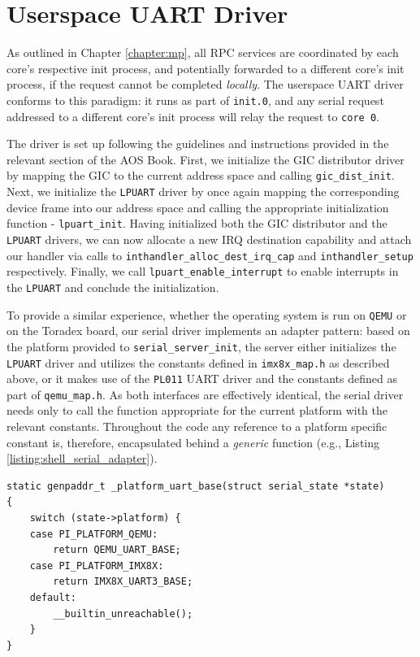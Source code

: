 \section{Userspace UART Driver}

As outlined in Chapter \ref{chapter:mp}, all RPC services are coordinated by each core's respective init process, and potentially forwarded to a different core's init process, if the request cannot be completed \emph{locally}. The userspace UART driver conforms to this paradigm: it runs as part of \texttt{init.0}, and any serial request addressed to a different core's init process will relay the request to \texttt{core 0}.

The driver is set up following the guidelines and instructions provided in the relevant section of the AOS Book. First, we initialize the GIC distributor driver by mapping the GIC to the current address space and calling \texttt{gic\_dist\_init}. Next, we initialize the \texttt{LPUART} driver by once again mapping the corresponding device frame into our address space and calling the appropriate initialization function - \texttt{lpuart\_init}. Having initialized both the GIC distributor and the \texttt{LPUART} drivers, we can now allocate a new IRQ destination capability and attach our handler via calls to \texttt{inthandler\_alloc\_dest\_irq\_cap} and \texttt{inthandler\_setup} respectively. Finally, we call \texttt{lpuart\_enable\_interrupt} to enable interrupts in the \texttt{LPUART} and conclude the initialization.

To provide a similar experience, whether the operating system is run on \texttt{QEMU} or on the Toradex board, our serial driver implements an adapter pattern: based on the platform provided to \texttt{serial\_server\_init}, the server either initializes the \texttt{LPUART} driver and utilizes the constants defined in \texttt{imx8x\_map.h} as described above, or it makes use of the \texttt{PL011} UART driver and the constants defined as part of \texttt{qemu\_map.h}. As both interfaces are effectively identical, the serial driver needs only to call the function appropriate for the current platform with the relevant constants. Throughout the code any reference to a platform specific constant is, therefore, encapsulated behind a \emph{generic} function (e.g., Listing \ref{listing:shell_serial_adapter}).

\begin{lstlisting}[caption={Serial Driver: Platform Independent UART Base},label={listing:shell_serial_adapter}]
static genpaddr_t _platform_uart_base(struct serial_state *state)
{
    switch (state->platform) {
    case PI_PLATFORM_QEMU:
        return QEMU_UART_BASE;
    case PI_PLATFORM_IMX8X:
        return IMX8X_UART3_BASE;
    default:
        __builtin_unreachable();
    }
}
\end{lstlisting}


